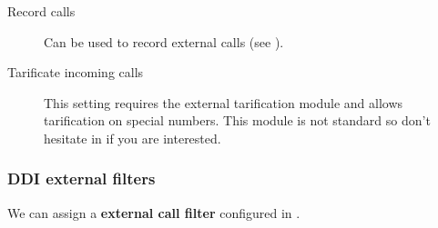 \documentclass[letterpaper,10pt,english]{sphinxmanual}
\begin{document}
\begin{description}
\item[{Record calls}] \leavevmode{}\label{administration_portal/client/vpbx/ddis:term-record-calls}
Can be used to record external calls (see {\hyperref[administration_portal/client/vpbx/calls/call_recordings:call\string-recordings]{}}).

\item[{Tarificate incoming calls}] \leavevmode{}\label{administration_portal/client/vpbx/ddis:term-tarificate-incoming-calls}
This setting requires the external tarification module and allows
tarification on special numbers. This module is not standard so don't
hesitate in {\hyperref[basic_concepts/intro/getting_help:getting\string-help]{}} if you are interested.

\end{description}


\subsubsection{DDI external filters}
\label{administration_portal/client/vpbx/ddis:ddi-external-filters}
We can assign a \textbf{external call filter} configured in {\hyperref[administration_portal/client/vpbx/routing_tools/external_call_filters:external\string-call\string-filters]{}}.
\end{document}
